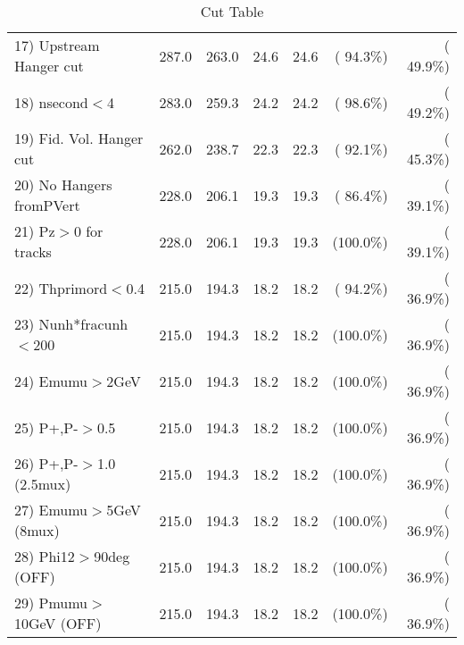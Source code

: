 \begin{table}[h!]
\begin{tabular}{||l||r|r|r|r|r|r||}
 17) Upstream Hanger cut  &        287.0 &        263.0 &         24.6 &         24.6 & ( 94.3\%) & ( 49.9\%) \\
 18) nsecond$<$4          &        283.0 &        259.3 &         24.2 &         24.2 & ( 98.6\%) & ( 49.2\%) \\
 19) Fid. Vol. Hanger cut &        262.0 &        238.7 &         22.3 &         22.3 & ( 92.1\%) & ( 45.3\%) \\
 20) No Hangers fromPVert &        228.0 &        206.1 &         19.3 &         19.3 & ( 86.4\%) & ( 39.1\%) \\
 21) Pz$>$0 for tracks    &        228.0 &        206.1 &         19.3 &         19.3 & (100.0\%) & ( 39.1\%) \\
 22) Thprimord$<$0.4      &        215.0 &        194.3 &         18.2 &         18.2 & ( 94.2\%) & ( 36.9\%) \\
 23) Nunh*fracunh$<$200   &        215.0 &        194.3 &         18.2 &         18.2 & (100.0\%) & ( 36.9\%) \\
 24) Emumu$>$2GeV         &        215.0 &        194.3 &         18.2 &         18.2 & (100.0\%) & ( 36.9\%) \\
 25) P+,P-$>$0.5          &        215.0 &        194.3 &         18.2 &         18.2 & (100.0\%) & ( 36.9\%) \\
 26) P+,P-$>$1.0 (2.5mux) &        215.0 &        194.3 &         18.2 &         18.2 & (100.0\%) & ( 36.9\%) \\
 27) Emumu$>$5GeV  (8mux) &        215.0 &        194.3 &         18.2 &         18.2 & (100.0\%) & ( 36.9\%) \\
 28) Phi12$>$90deg  (OFF) &        215.0 &        194.3 &         18.2 &         18.2 & (100.0\%) & ( 36.9\%) \\
 29) Pmumu$>$10GeV  (OFF) &        215.0 &        194.3 &         18.2 &         18.2 & (100.0\%) & ( 36.9\%) \\
 \hline
 \hline
 \end{tabular}
 \caption{Cut Table           }
 \label{tab-cutcohjpsi-mumu_anumucc}
 \end{table}
